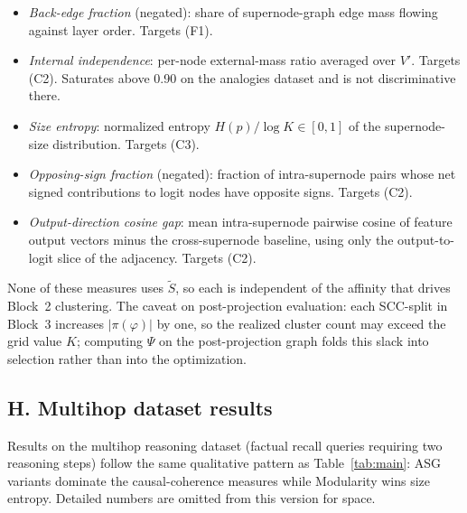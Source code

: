 \documentclass[table, 11pt]{article}
\begin{document}
\begin{itemize}[leftmargin=*,topsep=2pt,itemsep=1pt]
\item \emph{Back-edge fraction} (negated): share of supernode-graph
edge mass flowing against layer order. Targets (F1).
\item \emph{Internal independence}: per-node external-mass ratio
averaged over $V'$. Targets (C2). Saturates above 0.90 on the
analogies dataset and is not discriminative there.
\item \emph{Size entropy}: normalized entropy $H(p)/\log K \in [0,1]$
of the supernode-size distribution. Targets (C3).
\item \emph{Opposing-sign fraction} (negated): fraction of
intra-supernode pairs whose net signed contributions to logit nodes
have opposite signs. Targets (C2).
\item \emph{Output-direction cosine gap}: mean intra-supernode
pairwise cosine of feature output vectors minus the cross-supernode
baseline, using only the output-to-logit slice of the adjacency.
Targets (C2).
\end{itemize}

None of these measures uses $\tilde S$, so each is independent of
the affinity that drives Block~2 clustering. The caveat on
post-projection evaluation: each SCC-split in Block~3 increases
$|\pi(\varphi)|$ by one, so the realized cluster count may exceed
the grid value $K$; computing $\Psi$ on the post-projection graph
folds this slack into selection rather than into the optimization.

\subsection*{H. Multihop dataset results}\label{app:multihop}

Results on the multihop reasoning dataset (factual recall queries
requiring two reasoning steps) follow the same qualitative pattern
as Table~\ref{tab:main}: ASG variants dominate the causal-coherence
measures while Modularity wins size entropy. Detailed numbers are
omitted from this version for space.
\end{document}
